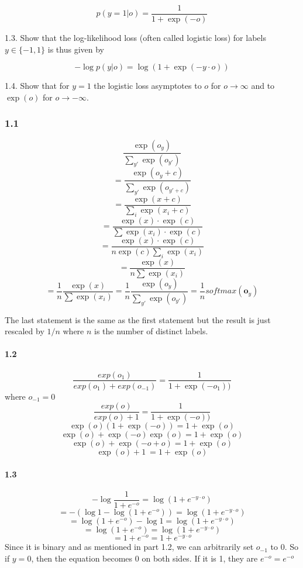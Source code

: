 \documentclass[11pt]{article}
\begin{document}
\[p(y=1|o) = \frac{1}{1 + \exp(-o)}\]

1.3. Show that the log-likelihood loss (often called logistic loss) for
labels \(y \in \{-1, 1\}\) is thus given by

\[-\log p(y|o) = \log (1 + \exp(-y \cdot o))\]

1.4. Show that for \(y = 1\) the logistic loss asymptotes to \(o\) for
\(o \to \infty\) and to \(\exp(o)\) for \(o \to -\infty\).

    \hypertarget{section}{%
\subsubsection{1.1}\label{section}}

    \[\frac{\exp(o_y)}{\sum_{y'}\exp(o_{y'})}\]
\[= \frac{\exp(o_y + c)}{\sum_{y'}\exp(o_{y'+c})}\]
\[= \frac{\exp(x+c)}{\sum_i \exp(x_i+c)}\]
\[= \frac{\exp(x)\cdot\exp(c)}{\sum \exp(x_i)\cdot\exp(c)}\]
\[= \frac{\exp(x)\cdot\exp(c)}{n\exp(c)\sum_i \exp(x_i)}\]
\[= \frac{\exp(x)}{n\sum \exp(x_i)}\]
\[= \frac{1}{n}\frac{\exp(x)}{\sum \exp(x_i)} = \frac{1}{n}\frac{\exp(o_y)}{\sum_{y'}\exp(o_{y'})} = \frac{1}{n}softmax(\mathbf{o}_y)\]

The last statement is the same as the first statement but the result is
just rescaled by \(1/n\) where \(n\) is the number of distinct labels.

    \hypertarget{section}{%
\paragraph{1.2}\label{section}}

    \[\frac{exp(o_1)}{exp(o_1) + exp(o_{-1})} = \frac{1}{1 + \exp(-o_1))}\]
where \(o_{-1} = 0\)
\[\frac{exp(o)}{exp(o) + 1} = \frac{1}{1 + \exp(-o))}\]
\[\exp(o)(1 + \exp(-o)) = 1 + \exp(o)\]
\[\exp(o) + \exp(-o)\exp(o) = 1 + \exp(o)\]
\[\exp(o) + \exp(-o + o) = 1 + \exp(o)\] \[\exp(o) + 1\ = 1 + \exp(o)\]

    \hypertarget{section}{%
\paragraph{1.3}\label{section}}

    \[-\log \frac{1}{1 + e^{-o}} = \log(1 + e^{-y \cdot o})\]
\[= - (\log 1 - \log(1 + e^{-o})) = \log(1 + e^{-y \cdot o})\]
\[= \log(1 + e^{-o}) - \log 1 = \log(1 + e^{-y \cdot o})\]
\[= \log(1 + e^{-o}) = \log(1 + e^{-y \cdot o})\]
\[= 1 + e^{-o} = 1 + e^{-y \cdot o}\] Since it is binary and as
mentioned in part 1.2, we can arbitrarily set \(o_{-1}\) to 0. So if
\(y = 0\), then the equation becomes 0 on both sides. If it is 1, they
are \(e^{-o} = e^{-o}\)
\end{document}
